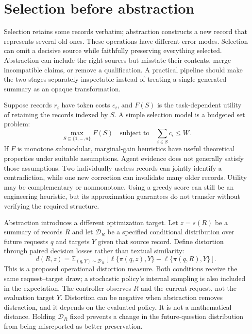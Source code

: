 \section{Selection before abstraction}\label{sec:C12:selection}
Selection retains some records verbatim; abstraction constructs a new record that represents several old ones. These operations have different error modes. Selection can omit a decisive source while faithfully preserving everything selected. Abstraction can include the right sources but misstate their contents, merge incompatible claims, or remove a qualification. A practical pipeline should make the two stages separately inspectable instead of treating a single generated summary as an opaque transformation.

Suppose records $r_i$ have token costs $c_i$, and $F(S)$ is the task-dependent utility of retaining the records indexed by $S$. A simple selection model is a budgeted set problem:
\begin{equation}
 \max_{S\subseteq\{1,\ldots,n\}}F(S)
 \quad\text{subject to}\quad\sum_{i\in S}c_i\leq W.
\end{equation}
If $F$ is monotone submodular, marginal-gain heuristics have useful theoretical properties under suitable assumptions. Agent evidence does not generally satisfy those assumptions. Two individually useless records can jointly identify a contradiction, while one new correction can invalidate many older records. Utility may be complementary or nonmonotone. Using a greedy score can still be an engineering heuristic, but its approximation guarantees do not transfer without verifying the required structure.

Abstraction introduces a different optimization target. Let $z=s(R)$ be a summary of records $R$ and let $\mathcal D_R$ be a specified conditional distribution over future requests $q$ and targets $Y$ given that source record. Define distortion through paired decision losses rather than textual similarity:
\begin{equation}
 d(R,z)=\mathbb E_{(q,Y)\sim\mathcal D_R}
 \left[\ell\{\pi(q,z),Y\}-\ell\{\pi(q,R),Y\}\right].
\end{equation}
This is a proposed operational distortion measure. Both conditions receive the same request--target draw; a stochastic policy's internal sampling is also included in the expectation. The controller observes $R$ and the current request, not the evaluation target $Y$. Distortion can be negative when abstraction removes distraction, and it depends on the evaluated policy. It is not a mathematical distance. Holding $\mathcal D_R$ fixed prevents a change in the future-question distribution from being misreported as better preservation.

